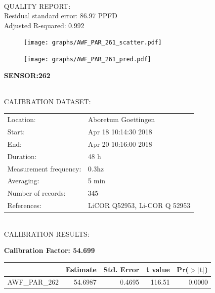 \documentclass[oneside]{report}
\begin{document}
\hrulefill\\
QUALITY REPORT:\\
Residual standard error: 86.97 PPFD\\
Adjusted R-squared: 0.992



\begin{figure}[H]
  \centering
  \texttt{[image: graphs/AWF\_PAR\_261\_scatter.pdf]}
\end{figure}




\begin{figure}[H]
  \centering
  \texttt{[image: graphs/AWF\_PAR\_261\_pred.pdf]}
\end{figure}

\pagebreak


\begin{center}
\large{\textbf{SENSOR:262}}\\
\end{center}

\hrulefill\\
CALIBRATION DATASET:\\
\begin{table}[h!]
  \centering
  \label{tab:table1}
  \begin{tabular}{ll}
    Location: & Aboretum Goettingen\\ 
    
    
    Start:  & Apr 18 10:14:30 2018 \\
    End:   & Apr 20 10:16:00 2018\\ 
    Duration: & 48 h\\
    Measurement frequency: & 0.3hz\\
    Averaging:  &5 min\\
    Number of records: & 345 \\
    References: & LiCOR Q52953, Li-COR Q 52953 \\
  \end{tabular}
\end{table}

\hrulefill\\
CALIBRATION RESULTS:\\


\begin{center}
\textbf{\large{Calibration Factor: 54.699}}\\
\end{center}
\begin{table}[ht]
\centering
\begin{tabular}{rrrrr}
  \hline
 & Estimate & Std. Error & t value & Pr($>$$|$t$|$) \\ 
  \hline
AWF\_PAR\_262 & 54.6987 & 0.4695 & 116.51 & 0.0000 \\ 
   \hline
\end{tabular}
\end{table}
\end{document}
